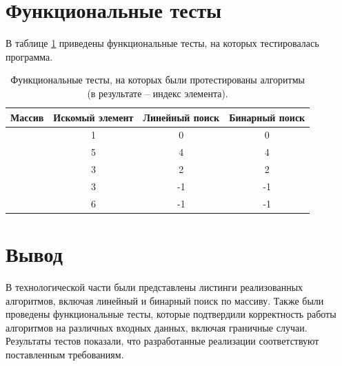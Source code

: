 \section{Функциональные тесты}
В таблице \ref{tbl:func_test} приведены функциональные тесты, на которых тестировалась программа.
\begin{table}[h]
    \begin{center}
        \caption{\label{tbl:func_test} Функциональные тесты, на которых были протестированы алгоритмы (в результате -- индекс элемента).}
        \begin{tabular}{|c|c|c|c|}
            \hline
            Массив & Искомый элемент & Линейный поиск & Бинарный поиск
            \\ \hline
            [ 1, 2, 3, 4, 5 ] & 1 & 0 & 0
            \\ \hline
            [ 1, 2, 3, 4, 5 ] & 5 & 4 & 4
            \\ \hline
            [ 1, 2, 3, 4, 5 ] & 3 & 2 & 2
            \\ \hline
            [] & 3 & -1 & -1
            \\ \hline
            [ 1, 2, 3, 4, 5 ] & 6 & -1 & -1
            \\ \hline
        \end{tabular}
    \end{center}
\end{table}

\section*{Вывод}

В технологической части были представлены листинги реализованных алгоритмов, включая линейный и бинарный поиск по массиву.
Также были проведены функциональные тесты, которые подтвердили корректность работы алгоритмов на различных входных данных, включая граничные случаи.
Результаты тестов показали, что разработанные реализации соответствуют поставленным требованиям.

